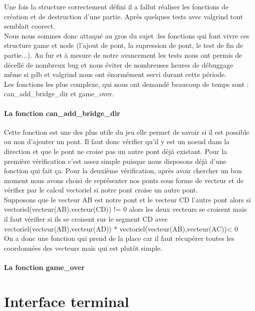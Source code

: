 \documentclass[12pt]{report}
\begin{document}
\textnormal{Une fois la structure correctement défini il a fallut réaliser les fonctions de création et de destruction d'une partie. Après quelques tests avec valgrind tout semblait coorect.\\ Nous nous sommes donc attaqué au gros du sujet :les fonctions qui font vivre ces structure game et node (l'ajout de pont, la supression de pont, le test de fin de partie...). Au fur et à mesure de notre avancement les tests nous ont permis de décellé de nombreux bug et nous éviter de nombreuses heures de débuggage même si gdb et valgrind nous ont énormément servi durant cette période.\\ Les fonctions les plus complexe, qui nous ont demandé beaucoup de temps sont : can\_add\_bridge\_dir et game\_over.}

\subsubsection{La fonction can\_add\_bridge\_dir}
\textnormal{Cette fonction est une des plus utile du jeu elle permet de savoir si il est possible ou non d'ajouter un pont. Il faut donc vérifier qu'il y est un noeud dans la direction et que le pont ne croise pas un autre pont déjà existant. Pour la première vérification c'est assez simple puisque nous disposons déjà d'une fonction qui fait ça. Pour la deuxième vérification, après avoir chercher un bon moment nous avons choisi de représenter nos ponts sous forme de vecteur et de vérifier par le calcul vectoriel si notre pont croise un autre pont. \\ Supposons que le vecteur AB est notre pont et le vecteur CD l'autre pont alors si vectoriel(vecteur(AB),vecteur(CD)) != 0 alors les deux vecteurs se croisent mais il faut vérifier si ils se croisent sur le segment CD avec vectoriel(vecteur(AB),vecteur(AD)) * vectoriel(vecteur(AB),vecteur(AC))< 0\\On a donc une fonction qui prend de la place car il faut récupérer toutes les coordonnées des vecteurs mais qui est plutôt simple.}

\subsubsection{La fonction game\_over}

\chapter{Interface terminal}
\end{document}
